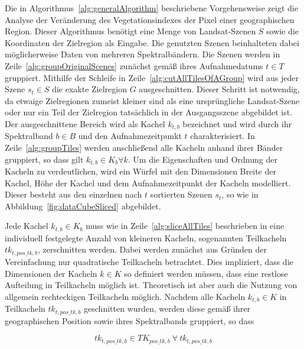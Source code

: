 Die in Algorithmus~\ref{alg:generalAlgorithm} beschriebene Vorgehensweise zeigt die Analyse der Veränderung des Vegetationsindexes der Pixel einer geographischen Region. Dieser Algorithmus benötigt eine Menge von Landsat-Szenen $S$ sowie die Koordinaten der Zielregion als Eingabe. Die genutzten Szenen beinhalteten dabei möglicherweise Daten von mehreren Spektralbändern. Die Szenen werden in Zeile~\ref{alg:groupOriginalScenes} zunächst gemäß ihres Aufnahmedatums $t \in T$ gruppiert. Mithilfe der Schleife in Zeile~\ref{alg:cutAllTilesOfAGroup} wird aus jeder Szene $s_t \in S$ die exakte Zielregion $G$ ausgeschnitten. Dieser Schritt ist notwendig, da etwaige Zielregionen zumeist kleiner sind als eine ursprüngliche Landsat-Szene oder nur ein Teil der Zielregion tatsächlich in der Ausgangsszene abgebildet ist. Der ausgeschnittene Bereich wird als Kachel $k_{t, b}$ bezeichnet und wird durch ihr Spektralband $b \in B$ und den Aufnahmezeitpunkt $t$ charakterisiert. In Zeile~\ref{alg:groupTiles} werden anschließend alle Kacheln anhand ihrer Bänder gruppiert, so dass gilt $k_{t, b} \in K_{b} \forall k$. Um die Eigenschaften und Ordnung der Kacheln zu verdeutlichen, wird ein Würfel mit den Dimensionen Breite der Kachel, Höhe der Kachel und dem Aufnahmezeitpunkt der Kacheln modelliert. Dieser besteht aus den einzelnen nach $t$ sortierten Szenen $s_t$, so wie in Abbildung~\ref{fig:dataCubeSliced} abgebildet. 

Jede Kachel $k_{t, b} \in K_{b}$ muss wie in Zeile~\ref{alg:sliceAllTiles} beschrieben in eine individuell festgelegte Anzahl von kleineren Kacheln, sogenannten Teilkacheln $tk_{t, pos\_tk, b}$, zerschnitten werden. Dabei werden zunächst aus Gründen der Vereinfachung nur quadratische Teilkacheln betrachtet. Dies impliziert, dass die Dimensionen der Kacheln $k \in K$ so definiert werden müssen, dass eine restlose Aufteilung in Teilkacheln möglich ist. Theoretisch ist aber auch die Nutzung von allgemein rechteckigen Teilkacheln möglich. Nachdem alle Kacheln $k_{t, b} \in K$ in Teilkacheln $tk_{t, pos\_tk, b}$ geschnitten wurden, werden diese gemäß ihrer geographischen Position sowie ihres Spektralbands gruppiert, so dass 

\begin{equation} \label{eq:numberOfSubsceneGroups}
tk_{t, pos\_tk, b} \in TK_{pos\_tk, b}\ \forall\ tk_{t, pos\_tk, b}
\end{equation}

